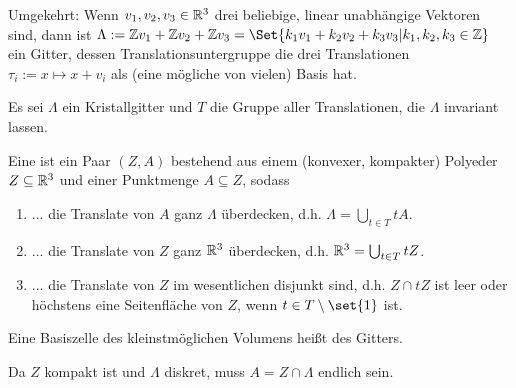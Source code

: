 \documentclass[fontsize=11pt,fleqn,a4paper]{scrartcl}
\begin{document}
\begin{example}
Umgekehrt: Wenn $v_1,v_2,v_3\in\mathbb{R}^3$ drei beliebige, linear unabhängige Vektoren sind, dann ist $\Lambda:=\IZ v_1+\IZ v_2 + \IZ v_3 = \Set{k_1 v_1+k_2 v_2+k_3 v_3 | k_1,k_2,k_3\in\IZ}$ ein Gitter, dessen Translationsuntergruppe die drei Translationen $\tau_i:=x\mapsto x+v_i$ als (eine mögliche von vielen) Basis hat.
\end{example}

\begin{definition}
Es sei $\Lambda$ ein Kristallgitter und $T$ die Gruppe aller Translationen, die $\Lambda$ invariant lassen.

Eine  ist ein Paar $(Z,A)$ bestehend aus einem (konvexer, kompakter) Polyeder $Z\subseteq\mathbb{R}^3$ und einer Punktmenge $A\subseteq Z$, sodass
\begin{enumerate}
\item ... die Translate von $A$ ganz $\Lambda$ überdecken, d.h. $\Lambda=\bigcup_{t\in T} tA$.
\item ... die Translate von $Z$ ganz $\mathbb{R}^3$ überdecken, d.h. $\mathbb{R}^3 = \bigcup_{t\in T} tZ$.
\item ... die Translate von $Z$ im wesentlichen disjunkt sind, d.h. $Z \cap tZ$ ist leer oder höchstens eine Seitenfläche von $Z$, wenn $t\in T\setminus\set{1}$ ist.
\end{enumerate}

Eine Basiszelle des kleinstmöglichen Volumens heißt  des Gitters.
\end{definition}

\begin{remark}
Da $Z$ kompakt ist und $\Lambda$ diskret, muss $A=Z\cap\Lambda$ endlich sein.
\end{remark}
\end{document}
